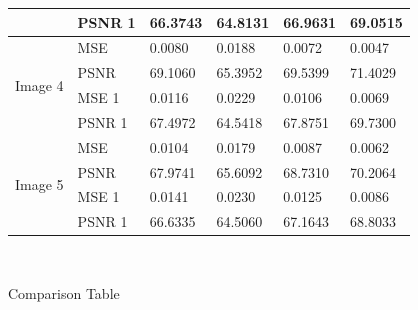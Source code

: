 \begin{center}
\begin{tabular}{|l|l|l|l|l|l|l|l|l|l|}
                         & PSNR 1 & \multicolumn{2}{l|}{66.3743} & \multicolumn{2}{l|}{64.8131} & \multicolumn{2}{l|}{66.9631}  & \multicolumn{2}{l|}{69.0515} \\ \hline
\multirow{4}{*}{Image 4} & MSE    & \multicolumn{2}{l|}{0.0080}  & \multicolumn{2}{l|}{0.0188}  & \multicolumn{2}{l|}{0.0072}   & \multicolumn{2}{l|}{0.0047}  \\ \cline{2-10} 
                         & PSNR   & \multicolumn{2}{l|}{69.1060} & \multicolumn{2}{l|}{65.3952} & \multicolumn{2}{l|}{69.5399}  & \multicolumn{2}{l|}{71.4029} \\ \cline{2-10} 
                         & MSE 1  & \multicolumn{2}{l|}{0.0116}  & \multicolumn{2}{l|}{0.0229}  & \multicolumn{2}{l|}{0.0106}   & \multicolumn{2}{l|}{0.0069}  \\ \cline{2-10} 
                         & PSNR 1 & \multicolumn{2}{l|}{67.4972} & \multicolumn{2}{l|}{64.5418} & \multicolumn{2}{l|}{67.8751}  & \multicolumn{2}{l|}{69.7300} \\ \hline
\multirow{4}{*}{Image 5} & MSE    & \multicolumn{2}{l|}{0.0104}  & \multicolumn{2}{l|}{0.0179}  & \multicolumn{2}{l|}{0.0087}   & \multicolumn{2}{l|}{0.0062}  \\ \cline{2-10} 
                         & PSNR   & \multicolumn{2}{l|}{67.9741} & \multicolumn{2}{l|}{65.6092} & \multicolumn{2}{l|}{68.7310}  & \multicolumn{2}{l|}{70.2064} \\ \cline{2-10} 
                         & MSE 1  & \multicolumn{2}{l|}{0.0141}  & \multicolumn{2}{l|}{0.0230}  & \multicolumn{2}{l|}{0.0125}   & \multicolumn{2}{l|}{0.0086}  \\ \cline{2-10} 
                         & PSNR 1 & \multicolumn{2}{l|}{66.6335} & \multicolumn{2}{l|}{64.5060} & \multicolumn{2}{l|}{67.1643}  & \multicolumn{2}{l|}{68.8033} \\ \hline
\end{tabular}

\

Comparison Table
\end{center}


\newpage
